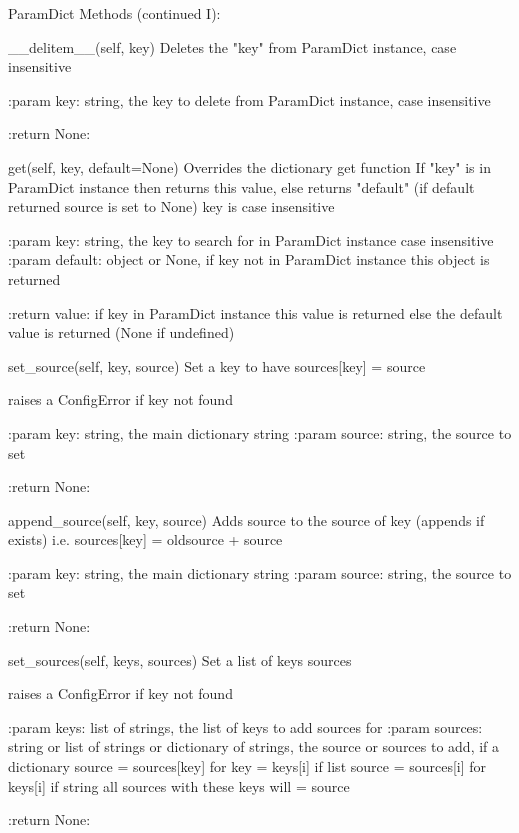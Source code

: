 \noindent\begin{minipage}{\textwidth}
\begin{pythondocstring}
ParamDict Methods (continued I):

	__delitem__(self, key)
	        Deletes the "key" from ParamDict instance, case insensitive

	        :param key: string, the key to delete from ParamDict instance,
	                    case insensitive

	        :return None:

	get(self, key, default=None)
	        Overrides the dictionary get function
	        If "key" is in ParamDict instance then returns this value, else
	        returns "default" (if default returned source is set to None)
	        key is case insensitive

	        :param key: string, the key to search for in ParamDict instance
	                    case insensitive
	        :param default: object or None, if key not in ParamDict instance this
	                        object is returned

	        :return value: if key in ParamDict instance this value is returned else
	                       the default value is returned (None if undefined)

	set_source(self, key, source)
	        Set a key to have sources[key] = source

	        raises a ConfigError if key not found

	        :param key: string, the main dictionary string
	        :param source: string, the source to set

	        :return None:

	append_source(self, key, source)
	        Adds source to the source of key (appends if exists)
	        i.e. sources[key] = oldsource + source

	        :param key: string, the main dictionary string
	        :param source: string, the source to set

	        :return None:

	set_sources(self, keys, sources)
	        Set a list of keys sources

	        raises a ConfigError if key not found

	        :param keys: list of strings, the list of keys to add sources for
	        :param sources: string or list of strings or dictionary of strings,
	                        the source or sources to add,
	                        if a dictionary source = sources[key] for key = keys[i]
	                        if list source = sources[i]  for keys[i]
	                        if string all sources with these keys will = source

	        :return None:
\end{pythondocstring}
\end{minipage}

